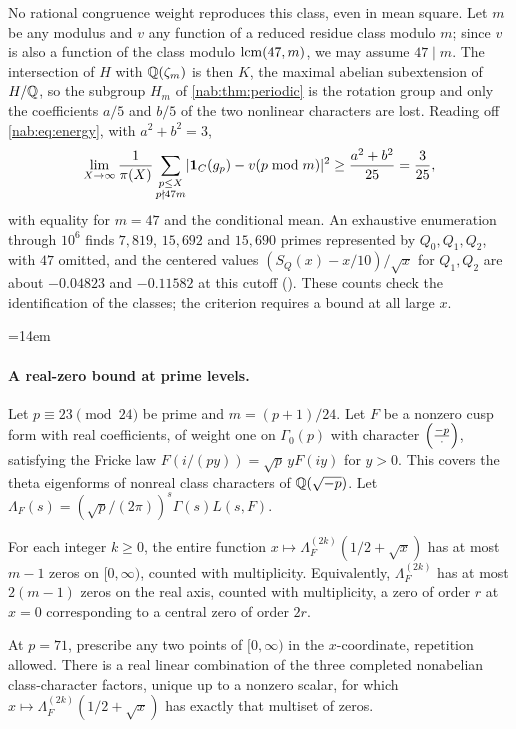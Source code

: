 No rational congruence weight reproduces this class, even in mean square. Let $m$ be any modulus and $v$
any function of a reduced residue class modulo $m$; since $v$ is also a function of the class modulo
$\operatorname{lcm}(47,m)$, we may assume $47\mid m$. The intersection of $H$ with $\mathbb{Q}(\zeta_m)$ is then $K$, the maximal
abelian subextension of $H/\mathbb{Q}$, so the subgroup $H_m$ of \cref{nab:thm:periodic} is the rotation group and
only the coefficients $a/5$ and $b/5$ of the two nonlinear characters are lost. Reading off
\eqref{nab:eq:energy}, with $a^2+b^2=3$,
\begin{equation}\label{hec:eq:325}
 \lim_{X\to\infty}\frac1{\pi(X)}\sum_{\substack{p\le X\\p\nmid47m}}\lvert\mathbf{1}_C(g_p)-v(p\bmod m)\rvert^2
 \ge\frac{a^2+b^2}{25}=\frac3{25},
\end{equation}
with equality for $m=47$ and the conditional mean. An exhaustive enumeration through $10^6$ finds $7{,}819$,
$15{,}692$ and $15{,}690$ primes represented by $Q_0,Q_1,Q_2$, with $47$ omitted, and the centered values
$(S_Q(x)-x/10)/\sqrt x$ for $Q_1,Q_2$ are about $-0.04823$ and $-0.11582$ at this cutoff
(). These counts check the identification of the classes;
the criterion requires a bound at all large $x$.
{\emergencystretch=14em\par}

\paragraph{A real-zero bound at prime levels.}
Let $p\equiv23\pmod{24}$ be prime and $m=(p+1)/24$. Let $F$ be a nonzero cusp form with real coefficients,
of weight one on $\Gamma_0(p)$ with character $\Bigl(\frac{-p}{\cdot}\Bigr)$, satisfying the Fricke law
$F(i/(py))=\sqrt p\,yF(iy)$ for $y>0$. This covers the theta eigenforms of nonreal class characters of
$\mathbb{Q}(\sqrt{-p})$. Let $\Lambda_F(s)=(\sqrt p/(2\pi))^s\Gamma(s)L(s,F)$.

\begin{theorem}\label{hec:thm:interp}
For each integer $k\ge0$, the entire function $x\mapsto\Lambda_F^{(2k)}(1/2+\sqrt x)$ has at most $m-1$
zeros on $[0,\infty)$, counted with multiplicity. Equivalently, $\Lambda_F^{(2k)}$ has at most $2(m-1)$
zeros on the real axis, counted with multiplicity, a zero of order $r$ at $x=0$ corresponding to a central
zero of order $2r$.

At $p=71$, prescribe any two points of $[0,\infty)$ in the $x$-coordinate, repetition allowed. There is a
real linear combination of the three completed nonabelian class-character factors, unique up to a nonzero
scalar, for which $x\mapsto\Lambda_F^{(2k)}(1/2+\sqrt x)$ has exactly that multiset of zeros.
\end{theorem}

